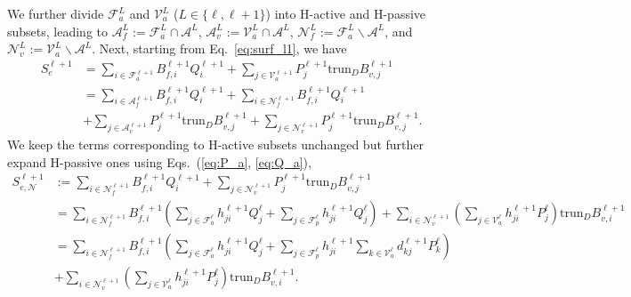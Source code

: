 \documentclass[graybox]{svmult}
\begin{document}
We further divide $\mathcal{F}_a^{L}$ and $\mathcal{V}_a^{L}$ ($L\in\{\ell,\ell+1\}$) into H-active and H-passive subsets, leading to $\mathcal{A}_{f}^L:=\mathcal{F}_a^L \cap \mathcal{A}^L$, $\mathcal{A}_{v}^L:=\mathcal{V}_a^L \cap \mathcal{A}^L$, $\mathcal{N}_{f}^L:=\mathcal{F}_a^L \backslash \mathcal{A}^L$, and $\mathcal{N}_{v}^L:=\mathcal{V}_a^L \backslash \mathcal{A}^L$. Next, starting from Eq.~\eqref{eq:surf_l1}, we have
\begin{equation}
\begin{aligned}
S_e^{\ell+1} &= \sum_{i\in \mathcal{F}_a^{\ell+1}} B_{f\!,i}^{\ell+1} Q_i^{\ell+1}  + \sum_{j\in\mathcal{V}_a^{\ell+1}} P_j^{\ell+1} \mathrm{trun}_D B_{v,j}^{\ell+1} \\
&= \sum_{i\in \mathcal{A}_f^{\ell+1}} B_{f\!,i}^{\ell+1} Q_i^{\ell+1} + \sum_{i\in \mathcal{N}_f^{\ell+1}} B_{f\!,i}^{\ell+1} Q_i^{\ell+1} \\
&+ \sum_{j\in\mathcal{A}_v^{\ell+1}} P_j^{\ell+1} \mathrm{trun}_D B_{v,j}^{\ell+1} + \sum_{j\in\mathcal{N}_v^{\ell+1}} P_j^{\ell+1} \mathrm{trun}_D B_{v,j}^{\ell+1} .
\end{aligned}
\label{eq:sap}
\end{equation}
We keep the terms corresponding to H-active subsets unchanged but further expand H-passive ones using Eqs.~(\ref{eq:P_a}, \ref{eq:Q_a}),
\begin{equation}
\begin{aligned}
S_{e,\mathcal{N}}^{\ell+1} &:= \sum_{i\in \mathcal{N}_f^{\ell+1}} B_{f\!,i}^{\ell+1} Q_i^{\ell+1} + \sum_{j\in\mathcal{N}_v^{\ell+1}} P_j^{\ell+1} \mathrm{trun}_D B_{v,j}^{\ell+1} \\
&= \sum_{i\in \mathcal{N}_f^{\ell+1}} B_{f\!,i}^{\ell+1} \left( \sum_{j\in\mathcal{F}_a^{\ell}} h_{ji}^{\ell+1} Q_j^{\ell} + \sum_{j\in\mathcal{F}_p^{\ell}} h_{ji}^{\ell+1} Q_j^{\ell} \right) + \sum_{i\in\mathcal{N}_v^{\ell+1}} \left( \sum_{j\in\mathcal{V}_a^\ell} h_{ji}^{\ell+1} P_j^{\ell} \right) \mathrm{trun}_D B_{v,i}^{\ell+1}  \\
&=\sum_{i\in \mathcal{N}_f^{\ell+1}} B_{f\!,i}^{\ell+1} \left( \sum_{j\in\mathcal{F}_a^{\ell}} h_{ji}^{\ell+1} Q_j^{\ell} + \sum_{j\in\mathcal{F}_p^{\ell}} h_{ji}^{\ell+1} \sum_{k\in\mathcal{V}_a^\ell} d_{kj}^{\ell+1} P_k^{\ell} \right) \\
&+ \sum_{i\in\mathcal{N}_v^{\ell+1}} \left( \sum_{j\in\mathcal{V}_a^\ell} h_{ji}^{\ell+1} P_j^{\ell} \right) \mathrm{trun}_D B_{v,i}^{\ell+1}.
\end{aligned}
\label{eq:sp}
\end{equation}
\end{document}
